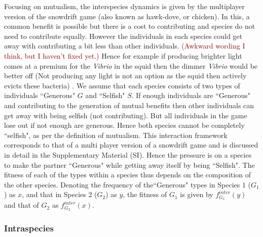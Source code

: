 \documentclass[12pt]{article}
\newcommand{\marcus}[1]{\textcolor{darkred}{(#1)}}
\begin{document}
Focusing on mutualism, the interspecies dynamics is given by the multiplayer version of the snowdrift game \citep{bergstrom:PNAS:2003,souza:JTB:2009,gokhale:PRSB:2012} (also known as hawk-dove, or chicken).
In this, a common benefit is possible but there is a cost to contributing and species do not need to contribute equally. However the individuals in each species could get away with contributing a bit less than other individuals.
\marcus{Awkward wording I think, but I haven't fixed yet.}
Hence for example if producing brighter light comes at a premium for the \textit{Vibrio} in the squid then the dimmer \textit{Vibrio} would be better off (Not producing any light is not an option as the squid then actively evicts these bacteria) \citep{mcfallngai:PLoSB:2014}.
We assume that each species consists of two types of individuals ``Generous" $G$ and ``Selfish" $S$. 
If enough individuals are ``Generous" and contributing to the generation of mutual benefits then other individuals can get away with being selfish (not contributing). But all individuals in the game lose out if not enough are generous. Hence both species cannot be completely ``selfish", as per the definition of mutualism.
This interaction framework corresponds to that of a multi player version of a snowdrift game and is discussed in detail in the Supplementary Material (SI).
Hence the pressure is on a species to make the partner ``Generous" while getting away itself by being ``Selfish".
The fitness of each of the types within a species thus depends on the composition of the other species.
Denoting the frequency of the``Generous" types in Species $1$ ($G_1$) as $x$, and that in Species $2$ ($G_2$) as $y$, the fitness of $G_1$  is given by $f^{inter}_{G_1} (y)$ and that of $G_2$ as $f^{inter}_{G_2} (x)$. 

\subsubsection{Intraspecies}
\end{document}
